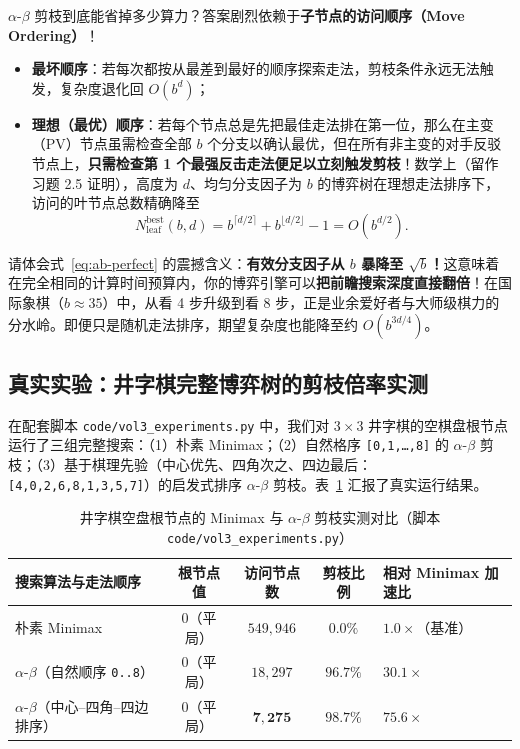 $\alpha$-$\beta$ 剪枝到底能省掉多少算力？答案剧烈依赖于\textbf{子节点的访问顺序（Move Ordering）}！
\begin{itemize}
  \item \textbf{最坏顺序}：若每次都按从最差到最好的顺序探索走法，剪枝条件永远无法触发，复杂度退化回 $O(b^d)$；
  \item \textbf{理想（最优）顺序}：若每个节点总是先把最佳走法排在第一位，那么在主变（PV）节点虽需检查全部 $b$ 个分支以确认最优，但在所有非主变的对手反驳节点上，\textbf{只需检查第 1 个最强反击走法便足以立刻触发剪枝}！数学上（留作习题 2.5 证明），高度为 $d$、均匀分支因子为 $b$ 的博弈树在理想走法排序下，访问的叶节点总数精确降至
  \begin{equation}\label{eq:ab-perfect}
    N_{\text{leaf}}^{\text{best}}(b, d) = b^{\lceil d/2 \rceil} + b^{\lfloor d/2 \rfloor} - 1 = O\!\left(b^{d/2}\right).
  \end{equation}
\end{itemize}
请体会式~\eqref{eq:ab-perfect} 的震撼含义：\textbf{有效分支因子从 $b$ 暴降至 $\sqrt{b}$！}这意味着在完全相同的计算时间预算内，你的博弈引擎可以\textbf{把前瞻搜索深度直接翻倍}！在国际象棋（$b\approx 35$）中，从看 4 步升级到看 8 步，正是业余爱好者与大师级棋力的分水岭。即便只是随机走法排序，期望复杂度也能降至约 $O(b^{3d/4})$。

\subsection{真实实验：井字棋完整博弈树的剪枝倍率实测}

在配套脚本 \texttt{code/vol3\_experiments.py} 中，我们对 $3\times 3$ 井字棋的空棋盘根节点运行了三组完整搜索：（1）朴素 Minimax；（2）自然格序 \texttt{[0,1,\dots,8]} 的 $\alpha$-$\beta$ 剪枝；（3）基于棋理先验（中心优先、四角次之、四边最后：\texttt{[4,0,2,6,8,1,3,5,7]}）的启发式排序 $\alpha$-$\beta$ 剪枝。表~\ref{tab:ttt-ab} 汇报了真实运行结果。

\begin{table}[htbp]
\centering
\caption{井字棋空盘根节点的 Minimax 与 $\alpha$-$\beta$ 剪枝实测对比（脚本 \texttt{code/vol3\_experiments.py}）}\label{tab:ttt-ab}
\small
\begin{tabularx}{\linewidth}{@{}lcccX@{}}
\toprule
\textbf{搜索算法与走法顺序} & \textbf{根节点值} & \textbf{访问节点数} & \textbf{剪枝比例} & \textbf{相对 Minimax 加速比} \\
\midrule
朴素 Minimax & $0$（平局） & $549{,}946$ & $0.0\%$ & $1.0\times$（基准） \\
$\alpha$-$\beta$（自然顺序 \texttt{0..8}） & $0$（平局） & $18{,}297$ & $\mathbf{96.7\%}$ & $30.1\times$ \\
$\alpha$-$\beta$（中心--四角--四边排序） & $0$（平局） & $\mathbf{7{,}275}$ & $\mathbf{98.7\%}$ & $\mathbf{75.6\times}$ \\
\bottomrule
\end{tabularx}
\end{table}

